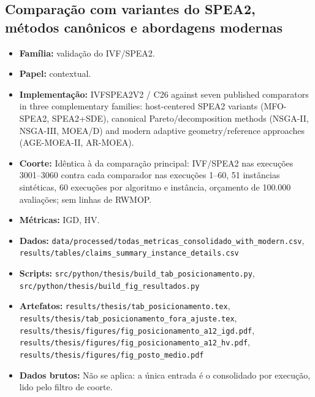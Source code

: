 \subsection*{Comparação com variantes do SPEA2, métodos canônicos e abordagens modernas}
\begin{itemize}[nosep]\raggedright
    \item \textbf{Família:} validação do IVF/SPEA2.
    \item \textbf{Papel:} contextual.
    \item \textbf{Implementação:} IVFSPEA2V2 / C26 against seven published comparators in three complementary families: host-centered SPEA2 variants (MFO-SPEA2, SPEA2+SDE), canonical Pareto/decomposition methods (NSGA-II, NSGA-III, MOEA/D) and modern adaptive geometry/reference approaches (AGE-MOEA-II, AR-MOEA).
    \item \textbf{Coorte:} Idêntica à da comparação principal: IVF/SPEA2 nas execuções 3001--3060 contra cada comparador nas execuções 1--60, 51 instâncias sintéticas, 60 execuções por algoritmo e instância, orçamento de 100.000 avaliações; sem linhas de RWMOP.
    \item \textbf{Métricas:} IGD, HV.
    \item \textbf{Dados:} \texttt{data/\allowbreak{}processed/\allowbreak{}todas\_\allowbreak{}metricas\_\allowbreak{}consolidado\_\allowbreak{}with\_\allowbreak{}modern.csv}, \texttt{results/\allowbreak{}tables/\allowbreak{}claims\_\allowbreak{}summary\_\allowbreak{}instance\_\allowbreak{}details.csv}
    \item \textbf{Scripts:} \texttt{src/\allowbreak{}python/\allowbreak{}thesis/\allowbreak{}build\_\allowbreak{}tab\_\allowbreak{}posicionamento.py}, \texttt{src/\allowbreak{}python/\allowbreak{}thesis/\allowbreak{}build\_\allowbreak{}fig\_\allowbreak{}resultados.py}
    \item \textbf{Artefatos:} \texttt{results/\allowbreak{}thesis/\allowbreak{}tab\_\allowbreak{}posicionamento.tex}, \texttt{results/\allowbreak{}thesis/\allowbreak{}tab\_\allowbreak{}posicionamento\_\allowbreak{}fora\_\allowbreak{}ajuste.tex}, \texttt{results/\allowbreak{}thesis/\allowbreak{}figures/\allowbreak{}fig\_\allowbreak{}posicionamento\_\allowbreak{}a12\_\allowbreak{}igd.pdf}, \texttt{results/\allowbreak{}thesis/\allowbreak{}figures/\allowbreak{}fig\_\allowbreak{}posicionamento\_\allowbreak{}a12\_\allowbreak{}hv.pdf}, \texttt{results/\allowbreak{}thesis/\allowbreak{}figures/\allowbreak{}fig\_\allowbreak{}posto\_\allowbreak{}medio.pdf}
    \item \textbf{Dados brutos:} Não se aplica: a única entrada é o consolidado por execução, lido pelo filtro de coorte.

\end{itemize}
